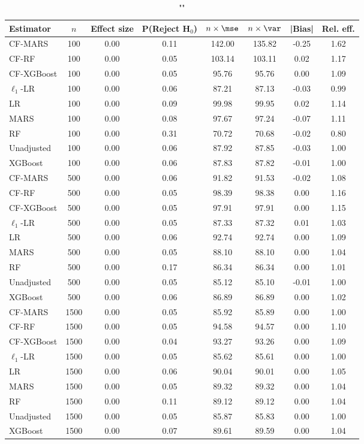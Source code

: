 \begin{table}
\centering
\caption{""}
\begin{tabular}{lccccccc}
\toprule
Estimator & $n$ & Effect size & P(Reject H$_0$) & $n\times\mse$ & $n\times \var$ & |Bias| & Rel. eff.\\ \midrule
CF-MARS & 100 & 0.00 & 0.11 & 142.00 & 135.82 & -0.25 & 1.62 \\ 
CF-RF & 100 & 0.00 & 0.05 & 103.14 & 103.11 &  0.02 & 1.17 \\ 
CF-XGBoost & 100 & 0.00 & 0.05 &  95.76 &  95.76 &  0.00 & 1.09 \\ 
$\ell_1$-LR & 100 & 0.00 & 0.06 &  87.21 &  87.13 & -0.03 & 0.99 \\ 
LR & 100 & 0.00 & 0.09 &  99.98 &  99.95 &  0.02 & 1.14 \\ 
MARS & 100 & 0.00 & 0.08 &  97.67 &  97.24 & -0.07 & 1.11 \\ 
RF & 100 & 0.00 & 0.31 &  70.72 &  70.68 & -0.02 & 0.80 \\ 
Unadjusted & 100 & 0.00 & 0.06 &  87.92 &  87.85 & -0.03 & 1.00 \\ 
XGBoost & 100 & 0.00 & 0.06 &  87.83 &  87.82 & -0.01 & 1.00 \\ \addlinespace 
CF-MARS & 500 & 0.00 & 0.06 &  91.82 &  91.53 & -0.02 & 1.08 \\ 
CF-RF & 500 & 0.00 & 0.05 &  98.39 &  98.38 &  0.00 & 1.16 \\ 
CF-XGBoost & 500 & 0.00 & 0.05 &  97.91 &  97.91 &  0.00 & 1.15 \\ 
$\ell_1$-LR & 500 & 0.00 & 0.05 &  87.33 &  87.32 &  0.01 & 1.03 \\ 
LR & 500 & 0.00 & 0.06 &  92.74 &  92.74 &  0.00 & 1.09 \\ 
MARS & 500 & 0.00 & 0.05 &  88.10 &  88.10 &  0.00 & 1.04 \\ 
RF & 500 & 0.00 & 0.17 &  86.34 &  86.34 &  0.00 & 1.01 \\ 
Unadjusted & 500 & 0.00 & 0.05 &  85.12 &  85.10 & -0.01 & 1.00 \\ 
XGBoost & 500 & 0.00 & 0.06 &  86.89 &  86.89 &  0.00 & 1.02 \\ \addlinespace 
CF-MARS & 1500 & 0.00 & 0.05 &  85.92 &  85.89 &  0.00 & 1.00 \\ 
CF-RF & 1500 & 0.00 & 0.05 &  94.58 &  94.57 &  0.00 & 1.10 \\ 
CF-XGBoost & 1500 & 0.00 & 0.04 &  93.27 &  93.26 &  0.00 & 1.09 \\ 
$\ell_1$-LR & 1500 & 0.00 & 0.05 &  85.62 &  85.61 &  0.00 & 1.00 \\ 
LR & 1500 & 0.00 & 0.06 &  90.04 &  90.01 &  0.00 & 1.05 \\ 
MARS & 1500 & 0.00 & 0.05 &  89.32 &  89.32 &  0.00 & 1.04 \\ 
RF & 1500 & 0.00 & 0.11 &  89.12 &  89.12 &  0.00 & 1.04 \\ 
Unadjusted & 1500 & 0.00 & 0.05 &  85.87 &  85.83 &  0.00 & 1.00 \\ 
XGBoost & 1500 & 0.00 & 0.07 &  89.61 &  89.59 &  0.00 & 1.04 \\
\bottomrule
\end{tabular}
\end{table}

